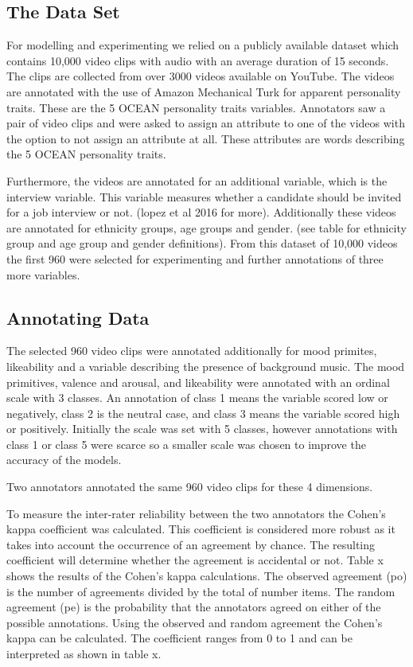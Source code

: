\subsection{The Data Set}
For modelling and experimenting we relied on a publicly available dataset which contains 10,000 video clips with audio with an average duration of 15 seconds. The clips are collected from over 3000 videos available on YouTube. The videos are annotated with the use of Amazon Mechanical Turk for apparent personality traits. These are the 5 OCEAN personality traits variables. Annotators saw a pair of video clips and were asked to assign an attribute to one of the videos with the option to not assign an attribute at all. These attributes are words describing the 5 OCEAN personality traits. 

Furthermore, the videos are annotated for an additional variable, which is the interview variable. This variable measures whether a candidate should be invited for a job interview or not. (lopez et al 2016 for more). Additionally these videos are annotated for ethnicity groups, age groups and gender. (see table for ethnicity group and age group and gender definitions). From this dataset of 10,000 videos the first 960 were selected for experimenting and further annotations of three more variables. 

\subsection{Annotating Data}
The selected 960 video clips were annotated additionally for mood primites, likeability and a variable describing the presence of background music. The mood primitives, valence and arousal, and likeability were annotated with an ordinal scale with 3 classes. An annotation of class 1 means the variable scored low or negatively, class 2 is the neutral case, and class 3 means the variable scored high or positively. Initially the scale was set with 5 classes, however annotations with class 1 or class 5 were scarce so a smaller scale was chosen to improve the accuracy of the models. 

Two annotators annotated the same 960 video clips for these 4 dimensions. 

To measure the inter-rater reliability between the two annotators the Cohen's kappa coefficient was calculated. This coefficient is considered more robust as it takes into account the occurrence of an agreement by chance. The resulting coefficient will determine whether the agreement is accidental or not. Table x shows the results of the Cohen's kappa calculations. The observed agreement (po) is the number of agreements divided by the total of number items. The random agreement (pe) is the probability that the annotators agreed on either of the possible annotations. Using the observed and random agreement the Cohen's kappa can be calculated. The coefficient ranges from 0 to 1 and can be interpreted as shown in table x.

